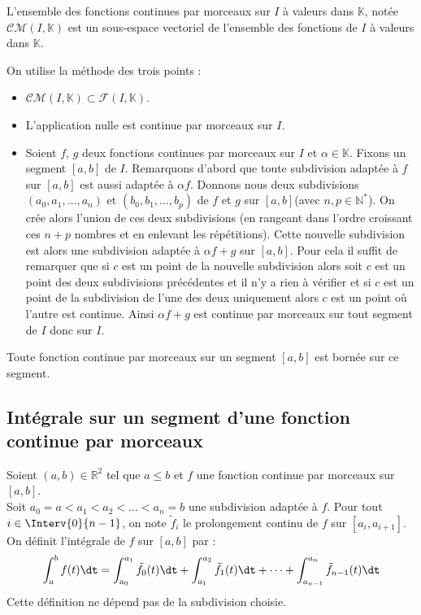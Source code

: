 \documentclass[a4paper,10pt]{report}
\begin{document}
\begin{prop} L'ensemble des fonctions continues par morceaux sur $I$ à valeurs dans $\mathbb{K}$, notée $\mathcal{CM}(I,\mathbb{K})$ est un sous-espace vectoriel de l'ensemble des fonctions de $I$ à valeurs dans $\mathbb{K}$.
\end{prop}

\begin{preuve} On utilise la méthode des trois points :

\begin{itemize}
\item $\mathcal{CM}(I,\mathbb{K}) \subset \mathcal{F}(I, \mathbb{K})$.
\item L'application nulle est continue par morceaux sur $I$.
\item Soient $f$, $g$ deux fonctions continues par morceaux sur $I$ et $\alpha \in \mathbb{K}$. Fixons un segment $[a,b]$ de $I$. Remarquons d'abord que toute subdivision adaptée à $f$ sur $[a,b]$ est aussi adaptée à $\alpha f$. Donnons nous deux subdivisions $(a_0, a_1, \ldots, a_n)$ et $(b_0,b_1, \ldots, b_p)$ de $f$ et $g$ sur $[a,b]$(avec $n,p \in \mathbb{N}^*$). On crée alors l'union de ces deux subdivisions (en rangeant dans l'ordre croissant ces $n+p$ nombres et en enlevant les répétitions). Cette nouvelle subdivision est alors une subdivision adaptée à $\alpha f + g$ sur $[a,b]$. Pour cela il suffit de remarquer que si $c$ est un point de la nouvelle subdivision alors soit $c$ est un point des deux subdivisions précédentes et il n'y a rien à vérifier et si $c$ est un point de la subdivision de l'une des deux uniquement alors $c$ est un point où l'autre est continue. Ainsi $\alpha f+g$ est continue par morceaux sur tout segment de $I$ donc sur $I$.
\end{itemize}
\end{preuve}

\begin{prop} Toute fonction continue par morceaux sur un segment $[a,b]$ est bornée sur ce segment.
\end{prop}



\subsection{Intégrale sur un segment d'une fonction continue par morceaux}

\begin{defip} 
Soient $(a,b) \in \mathbb{R}^2$ tel que $a \leq b$ et $f$ une fonction continue par morceaux sur $[a,b]$.\\
Soit $a_0 = a < a_1 < a_2 < \dots < a_n =b$ une subdivision adaptée à $f$. Pour tout $i \in \Interv{0}{n-1}$, on note $\tilde{f}_i$ le prolongement continu de $f$ sur $[a_i,a_{i+1}]$. On définit l'intégrale de $f$ sur $[a,b]$ par :
$$ \int_{a}^b f(t) \dt = \int_{a_0}^{a_1} \tilde{f}_0(t) \dt + \int_{a_1}^{a_2} \tilde{f}_1(t) \dt + \cdots + \int_{a_{n-1}}^{a_n} \tilde{f}_{n-1}(t) \dt$$
Cette définition ne dépend pas de la subdivision choisie.
\end{defip}
\end{document}
